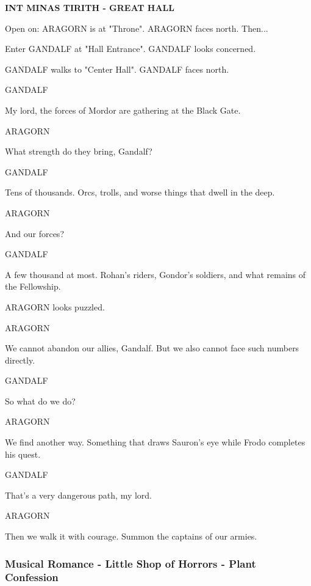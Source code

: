 \documentclass[11pt,letterpaper,oldstylefigures]{memoir}
\newcommand{\slugline}[1]{\nobreak\textbf{\MakeUppercase{#1}}\par\nobreak\vspace{1\baselineskip}}
\newcommand{\speaker}[1]{\nobreak\hspace*{0.333\textwidth}\MakeUppercase{#1}\par\nobreak\vspace{0.5\baselineskip}}
\newcommand{\dialogue}[1]{\nobreak\hspace*{0.25\textwidth}\begin{minipage}{0.5\textwidth}#1\end{minipage}\par\vspace{1\baselineskip}}
\newcommand{\stagedir}[1]{#1\par\vspace{1\baselineskip}}
\newenvironment{FountainExample}
  {\begingroup
  \ttfamily\small
   \setlength{\parindent}{0pt}
  \setlength{\parskip}{0.5em}
  \allowdisplaybreaks
  \setlength{\displaywidowpenalty}{0}
  \setlength{\widowpenalty}{0}
  \setlength{\clubpenalty}{0}
  \setlength{\interlinepenalty}{0}
}
  {\endgroup}
\begin{document}
\begin{FountainExample}
\slugline{INT MINAS TIRITH - GREAT HALL}

\stagedir{Open on: ARAGORN is at "Throne". ARAGORN faces north. Then...}
\stagedir{Enter GANDALF at "Hall Entrance". GANDALF looks concerned.}
\stagedir{GANDALF walks to "Center Hall". GANDALF faces north.}

\speaker{GANDALF}
\dialogue{My lord, the forces of Mordor are gathering at the Black Gate.}

\speaker{ARAGORN}
\dialogue{What strength do they bring, Gandalf?}

\speaker{GANDALF}
\dialogue{Tens of thousands. Orcs, trolls, and worse things that dwell in the deep.}

\speaker{ARAGORN}
\dialogue{And our forces?}

\speaker{GANDALF}
\dialogue{A few thousand at most. Rohan's riders, Gondor's soldiers, and what remains of the Fellowship.}

\stagedir{ARAGORN looks puzzled.}

\speaker{ARAGORN}
\dialogue{We cannot abandon our allies, Gandalf. But we also cannot face such numbers directly.}

\speaker{GANDALF}
\dialogue{So what do we do?}

\speaker{ARAGORN}
\dialogue{We find another way. Something that draws Sauron's eye while Frodo completes his quest.}

\speaker{GANDALF}
\dialogue{That's a very dangerous path, my lord.}

\speaker{ARAGORN}
\dialogue{Then we walk it with courage. Summon the captains of our armies.}
\end{FountainExample}

\subsubsection*{Musical Romance - Little Shop of Horrors - Plant Confession}
\label{ex:musical-romance-little-shop}
\end{document}
